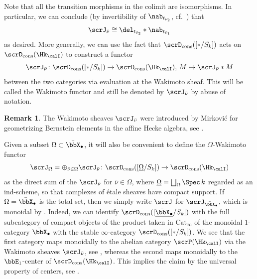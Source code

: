 \documentclass[10pt, reqno]{amsart}
\theoremstyle{plain}
\theoremstyle{definition}
\newtheorem{remark}[theorem]{Remark}
\numberwithin{equation}{section}
\begin{document}
	Note that all the transition morphisms in the colimit are isomorphisms. In particular, we can conclude (by invertibility of $\nab_{t_{\bar{\nu_2}}}$, cf.\ ) that
	\begin{equation}
		\scrJ_{\bar{\nu}}\cong \del_{t_{\bar\nu_2}}\ast \nab_{t_{\bar\nu_1}}
	\end{equation}
	as desired. More generally, we can use the fact that $\scrD_{\mathrm{cons}}([*/S_k])$ acts on $\scrD_{\mathrm{cons}}(\Hk_{\calI})$ to construct a functor 
	\begin{equation}
		\scrJ_{\bar\nu} \colon \scrD_{\mathrm{cons}}([*/S_k]) \to \scrD_{\mathrm{cons}}(\Hk_{\calI}), \, M \mapsto \scrJ_{\bar{\nu}} \ast M
	\end{equation}
	between the two categories via evaluation at the Wakimoto sheaf. This will be called the Wakimoto functor and still be denoted by $\scrJ_{\bar \nu}$ by abuse of notation.
	
	\begin{remark}
		\label{sec:wakim-funct-calj-1-remark-on-wakimoto-sheaves}
		The Wakimoto sheaves $\scrJ_{\bar\nu}$ were introduced by Mirkovi\'c for geometrizing Bernstein elements in the affine Hecke algebra, see \cite[Section 5.1]{AR}. 
	\end{remark}
	
	Given a subset $\Omega \subset \bar \bbX_\bullet$, it will also be convenient to define the $\Omega$-Wakimoto functor
	\begin{equation}
		\scrJ_\Omega=\oplus_{\bar \nu\in \Omega} \scrJ_{\bar \nu} \colon \scrD_{\mathrm{cons}}([\underline{\Omega}/S_k]) \to \scrD_{\mathrm{cons}}(\Hk_\calI)
	\end{equation}as the direct sum of the $\scrJ_{\bar\nu}$ for $\bar \nu \in \Omega$, where $\underline{\Omega}=\bigsqcup_{\Omega} \Spec\, k$ regarded as an ind-scheme, so that complexes of étale sheaves have compact support. If $\Omega=\bar \bbX_\bullet$ is the total set, then we simply write $\scrJ$ for $\scrJ_{\bar \bbX_\bullet}$, which is monoidal by . Indeed, we can identify $\scrD_{\mathrm{cons}}([\underline{\bar \bbX_\bullet}/S_k])$ with the full subcategory of compact objects of the product taken in $\mathrm{Cat}_\infty$ of the monoidal $1$-category $\bar \bbX_{\bullet}$ with the stable $\infty$-category $\scrD_{\mathrm{cons}}([*/S_k])$. We see that the first category maps monoidally to the abelian category $\scrP(\Hk_{\calI})$ via the Wakimoto sheaves $\scrJ_{\bar{\nu}}$, see \cite[Section 4.2.3]{AR}, whereas the second maps monoidally to the $\bbE_1$-center of $\scrD_{\mathrm{cons}}(\Hk_{\calI})$. This implies the claim by the universal property of centers, see \cite[Proposition 5.3.1.8]{Lur17}.
	
\end{document}
